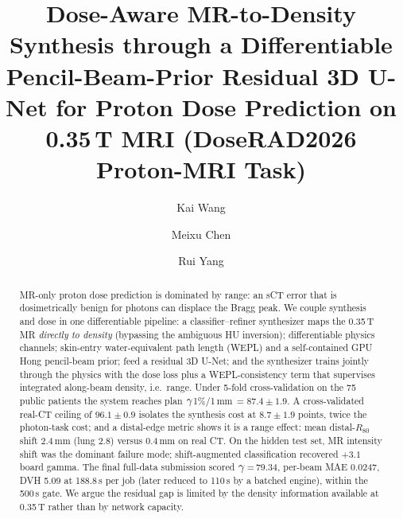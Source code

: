 \documentclass{llncs}
\begin{document}
\title{Dose-Aware MR-to-Density Synthesis through a Differentiable Pencil-Beam-Prior Residual
3D U-Net for Proton Dose Prediction on 0.35\,T MRI (DoseRAD2026 Proton-MRI Task)}
\author{Kai Wang \and Meixu Chen \and Rui Yang}

\maketitle

\begin{abstract}
MR-only proton dose prediction is dominated by range: an sCT error that is dosimetrically benign
for photons can displace the Bragg peak. We couple synthesis and dose in one differentiable
pipeline: a classifier--refiner synthesizer maps the 0.35\,T MR \emph{directly to density}
(bypassing the ambiguous HU inversion); differentiable physics channels; skin-entry
water-equivalent path length (WEPL) and a self-contained GPU Hong pencil-beam prior; feed a
residual 3D U-Net; and the synthesizer trains jointly through the physics with the dose loss
plus a WEPL-consistency term that supervises integrated along-beam density, i.e.\ range. Under
5-fold cross-validation on the 75 public patients the system reaches plan
$\gamma$1\%/1\,mm\,$=87.4\pm1.9$. A cross-validated real-CT ceiling of $96.1\pm0.9$ isolates the
synthesis cost at $8.7\pm1.9$ points, twice the photon-task cost; and a distal-edge metric
shows it is a range effect: mean distal-$R_{80}$ shift 2.4\,mm (lung 2.8) versus 0.4\,mm on
real CT. On the hidden test set, MR intensity shift was the dominant failure mode;
shift-augmented classification recovered $+3.1$ board gamma. The final full-data submission
scored $\gamma$\,=\,79.34, per-beam MAE 0.0247, DVH 5.09 at 188.8\,s per job (later reduced to
110\,s by a batched engine), within the 500\,s gate. We argue the residual gap is limited by the
density information available at 0.35\,T rather than by network capacity.
\end{abstract}
\end{document}
